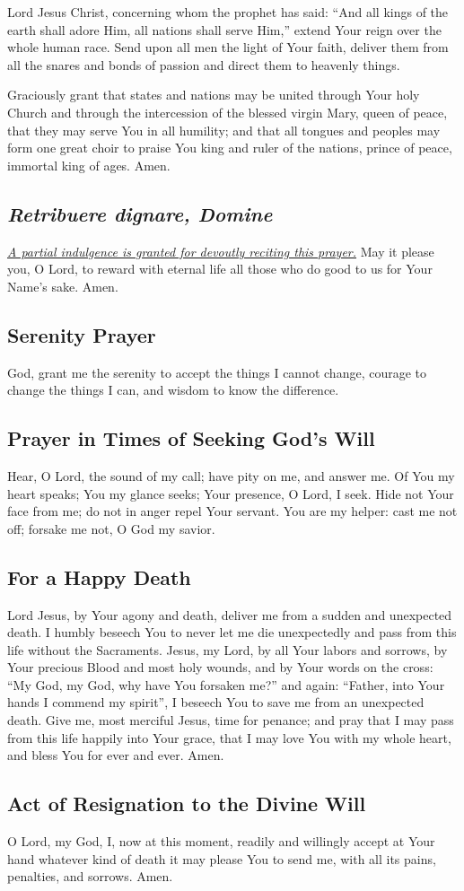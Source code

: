 \documentclass[12pt]{article}
\newcommand{\prayertitle}[1]{\subsection{#1}}
\newcommand{\indulgencedprayertitle}[1]{\prayertitle{#1 \protect\kreuz}}
\newcommand{\foreign}[1]{\textsl{#1}}
\newcommand{\note}[1]{{\small{\textsl{#1}}}\newline}
\newcommand{\linkednote}[2]{\hyperlink{#1}{\note{#2}}}
\begin{document}
Lord Jesus Christ, concerning whom the prophet has said:
``And all kings of the earth shall adore Him, all nations shall serve Him,''
extend Your reign over the whole human race.
Send upon all men the light of Your faith, deliver them from all the snares and bonds of passion and direct them to heavenly things.

Graciously grant that states and nations may be united through Your holy Church and through the intercession of the blessed virgin Mary, queen of peace, that they may serve You in all humility;
and that all tongues and peoples may form one great choir to praise You king and ruler of the nations, prince of peace, immortal king of ages.
Amen.

\indulgencedprayertitle{\foreign{Retribuere dignare, Domine}}
\linkednote{grant24}{A partial indulgence is granted for devoutly reciting this prayer.}
May it please you, O Lord, to reward with eternal life all those who do good to us for Your Name's sake. Amen.

\prayertitle{Serenity Prayer}
God, grant me the serenity to accept the things I cannot change,
courage to change the things I can,
and wisdom to know the difference.

\prayertitle{Prayer in Times of Seeking God's Will}
Hear, O Lord, the sound of my call;
have pity on me, and answer me.
Of You my heart speaks;
You my glance seeks;
Your presence, O Lord, I seek.
Hide not Your face from me; 
do not in anger repel Your servant.
You are my helper: cast me not off;
forsake me not, O God my savior.

\prayertitle{For a Happy Death}
Lord Jesus, by Your agony and death, deliver me from a sudden and unexpected death.
I humbly beseech You to never let me die unexpectedly and pass from this life without the Sacraments.
Jesus, my Lord, by all Your labors and sorrows, by Your precious Blood and most holy wounds, and by Your words on the cross:
``My God, my God, why have You forsaken me?''
and again:
``Father, into Your hands I commend my spirit'',
I beseech You to save me from an unexpected death.
Give me, most merciful Jesus, time for penance;
and pray that I may pass from this life happily into Your grace, that I may love You with my whole heart, and bless You for ever and ever.
Amen.

\prayertitle{Act of Resignation to the Divine Will}
O Lord, my God, I, now at this moment, readily and willingly accept at Your hand whatever kind of death it may please You to send me, with all its pains, penalties, and sorrows.
Amen.
\end{document}
